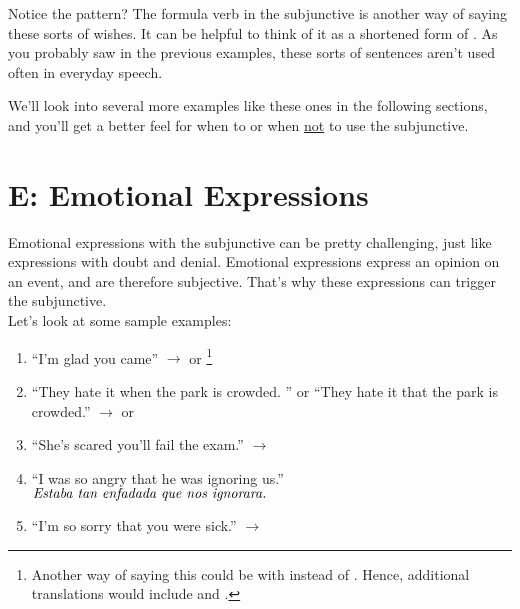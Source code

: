 Notice the pattern? The formula  verb in the subjunctive is another way of saying these sorts of wishes. It can be helpful to think of it as a shortened form of . As you probably saw in the previous examples, these sorts of sentences aren't used often in everyday speech. 

We'll look into several more examples like these ones in the following sections, and you'll get a better feel for when to or when \underline{not} to use the subjunctive.
\section{E: Emotional Expressions}
Emotional expressions with the subjunctive can be pretty challenging, just like expressions with doubt and denial. Emotional expressions express an opinion on an event, and are therefore subjective. That's why these expressions can trigger the subjunctive. \\

Let's look at some sample examples: 
\begin{enumerate}[noitemsep]
	\item ``I'm glad you came'' $\rightarrow$  or  \footnote{Another way of saying this could be with  instead of .  Hence, additional translations would include  and .}
	\item ``They hate it when the park is crowded. '' or ``They hate it that the park is crowded.'' $\rightarrow$  or 
	\item ``She's scared you'll fail the exam.'' $\rightarrow$ 
	\item ``I was so angry that he was ignoring us.'' $\textit{Estaba tan enfadada que nos ignorara.}$
	\item ``I'm so sorry that you were sick.'' $\rightarrow$ 
\end{enumerate}

